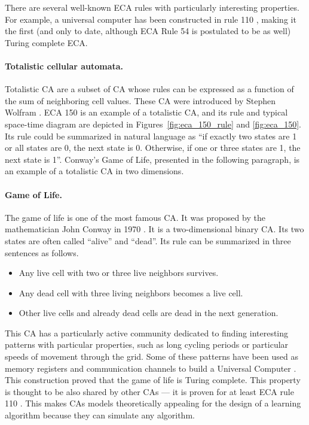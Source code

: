 There are several well-known \ac{ECA} rules with particularly interesting
properties. For example, a universal computer has been constructed in rule 110
\parencite{cookUniversalityElementaryCellular2004}, making it the first (and
only to date, although \ac{ECA} Rule 54 is postulated to be as well) Turing complete \ac{ECA}.

\paragraph{Totalistic cellular automata.}
Totalistic \ac{CA} are a subset of \ac{CA} whose rules can be expressed as a
function of the sum of neighboring cell values. These \ac{CA} were introduced by
Stephen Wolfram \parencite{wolframStatisticalMechanicsCellular1983}. \ac{ECA} 150 is 
an example of a totalistic \ac{CA}, and its rule and typical space-time diagram are depicted in Figures~\ref{fig:eca_150_rule} and \ref{fig:eca_150}. Its rule could be summarized 
in natural language as 
``if exactly two states are 1 or all states are 0, the next state is 0. Otherwise, if 
one or three states are 1, the next state is 1''. Conway's Game of Life, presented 
in the following paragraph, is an example
of a totalistic \ac{CA} in two dimensions.

\paragraph{Game of Life.\label{sec:game-life}}
The game of life is one of the most famous \ac{CA}. It was proposed by the
mathematician John Conway in 1970 \parencite{gardnerMathematicalGames1970}. It
is a two-dimensional binary \ac{CA}. Its two states are often called ``alive''
and ``dead''. Its rule can be summarized in three sentences as follows.
\begin{itemize}
  \item Any live cell with two or three live neighbors survives.
  \item Any dead cell with three living neighbors becomes a live cell.
  \item Other live cells and already dead cells are dead in the next generation.
\end{itemize}
This \ac{CA} has a particularly active community dedicated to finding
interesting patterns with particular properties, such as long cycling periods or
particular speeds of movement through the grid. Some of these patterns have been
used as memory registers and communication channels to build a Universal
Computer \parencite{IgblanLifeUniversal}. This construction proved that the game
of life is Turing complete. This property is thought to be also shared by other
\acp{CA} --- it is proven for at least \ac{ECA} rule 110
\parencite{cookUniversalityElementaryCellular2004}. This makes \acp{CA}
models theoretically appealing for the design of a learning algorithm because
they can simulate any algorithm.

